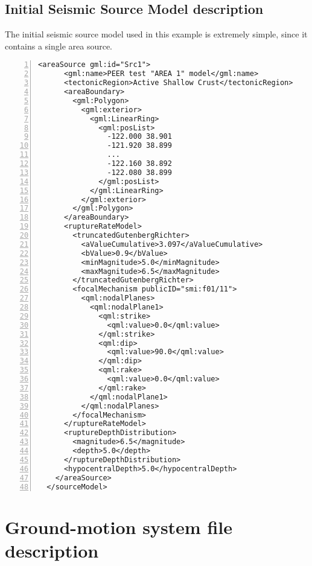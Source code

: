 \subsection{Initial Seismic Source Model description}
The initial seismic source model used in this example is extremely simple, 
since it contains a single area source. 
%
\begin{Verbatim}[baselinestretch=1,fontsize=\small,numbers=left,frame=single]
    <areaSource gml:id="Src1">
      <gml:name>PEER test "AREA 1" model</gml:name>
      <tectonicRegion>Active Shallow Crust</tectonicRegion>
      <areaBoundary>
        <gml:Polygon>
          <gml:exterior>
            <gml:LinearRing>
              <gml:posList>
				-122.000 38.901 
				-121.920 38.899 
				...
				-122.160 38.892 
				-122.080 38.899 
			  </gml:posList>
            </gml:LinearRing>
          </gml:exterior>
        </gml:Polygon>
      </areaBoundary>
      <ruptureRateModel>
        <truncatedGutenbergRichter>
          <aValueCumulative>3.097</aValueCumulative>
          <bValue>0.9</bValue>
          <minMagnitude>5.0</minMagnitude>
          <maxMagnitude>6.5</maxMagnitude>
        </truncatedGutenbergRichter>
        <focalMechanism publicID="smi:f01/11">
          <qml:nodalPlanes>
            <qml:nodalPlane1>
              <qml:strike>
                <qml:value>0.0</qml:value>
              </qml:strike>
              <qml:dip>
                <qml:value>90.0</qml:value>
              </qml:dip>
              <qml:rake>
                <qml:value>0.0</qml:value>
              </qml:rake>
            </qml:nodalPlane1>
          </qml:nodalPlanes>
        </focalMechanism>
      </ruptureRateModel>
      <ruptureDepthDistribution>
        <magnitude>6.5</magnitude>
        <depth>5.0</depth>
      </ruptureDepthDistribution>
      <hypocentralDepth>5.0</hypocentralDepth>
    </areaSource>
  </sourceModel>
\end{Verbatim}


%
\section{Ground-motion system file description}